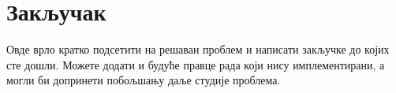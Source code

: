 \section{Закључак}
Овде врло кратко подсетити на решаван проблем и написати закључке до којих сте дошли. Можете додати и будуће правце рада који нису имплементирани, а могли би допринети побољшању даље студије проблема.